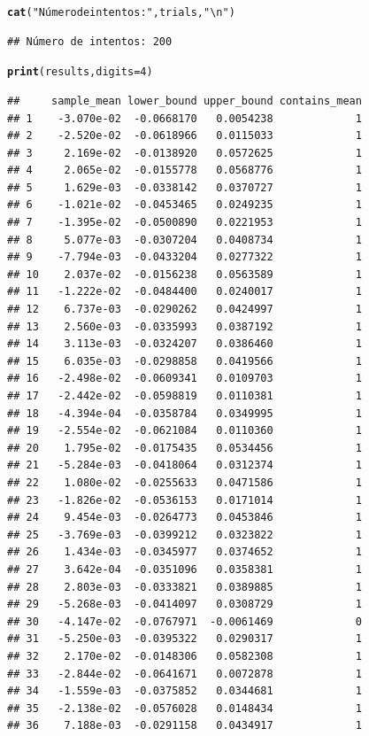 \documentclass[12pt]{article}\usepackage[]{graphicx}\usepackage[]{xcolor}
\makeatletter
\newcommand{\hlnum}[1]{\textcolor[rgb]{0.686,0.059,0.569}{#1}}%
\newcommand{\hlsng}[1]{\textcolor[rgb]{0.192,0.494,0.8}{#1}}%
\newcommand{\hldef}[1]{\textcolor[rgb]{0.345,0.345,0.345}{#1}}%
\newcommand{\hlkwc}[1]{\textcolor[rgb]{0.333,0.667,0.333}{#1}}%
\newcommand{\hlkwd}[1]{\textcolor[rgb]{0.737,0.353,0.396}{\textbf{#1}}}%
\newenvironment{kframe}{%
 \def\at@end@of@kframe{}%
 \ifinner\ifhmode%
  \def\at@end@of@kframe{\end{minipage}}%
  \begin{minipage}{\columnwidth}%
 \fi\fi%
 \def\FrameCommand##1{\hskip\@totalleftmargin \hskip-\fboxsep
 \colorbox{shadecolor}{##1}\hskip-\fboxsep
     \hskip-\linewidth \hskip-\@totalleftmargin \hskip\columnwidth}%
 \MakeFramed {\advance\hsize-\width
   \@totalleftmargin\z@ \linewidth\hsize
   \@setminipage}}%
 {\par\unskip\endMakeFramed%
 \at@end@of@kframe}
\newenvironment{knitrout}{}{} %
\makeatother
\begin{document}
\begin{knitrout}
\begin{kframe}
\begin{alltt}
\hlkwd{cat}\hldef{(}\hlsng{"Número de intentos:"}\hldef{, trials,} \hlsng{"\textbackslash{}n"}\hldef{)}
\end{alltt}
\begin{verbatim}
## Número de intentos: 200
\end{verbatim}
\begin{alltt}
\hlkwd{print}\hldef{(results,} \hlkwc{digits}\hldef{=} \hlnum{4}\hldef{)}
\end{alltt}
\begin{verbatim}
##     sample_mean lower_bound upper_bound contains_mean
## 1    -3.070e-02  -0.0668170   0.0054238             1
## 2    -2.520e-02  -0.0618966   0.0115033             1
## 3     2.169e-02  -0.0138920   0.0572625             1
## 4     2.065e-02  -0.0155778   0.0568776             1
## 5     1.629e-03  -0.0338142   0.0370727             1
## 6    -1.021e-02  -0.0453465   0.0249235             1
## 7    -1.395e-02  -0.0500890   0.0221953             1
## 8     5.077e-03  -0.0307204   0.0408734             1
## 9    -7.794e-03  -0.0433204   0.0277322             1
## 10    2.037e-02  -0.0156238   0.0563589             1
## 11   -1.222e-02  -0.0484400   0.0240017             1
## 12    6.737e-03  -0.0290262   0.0424997             1
## 13    2.560e-03  -0.0335993   0.0387192             1
## 14    3.113e-03  -0.0324207   0.0386460             1
## 15    6.035e-03  -0.0298858   0.0419566             1
## 16   -2.498e-02  -0.0609341   0.0109703             1
## 17   -2.442e-02  -0.0598819   0.0110381             1
## 18   -4.394e-04  -0.0358784   0.0349995             1
## 19   -2.554e-02  -0.0621084   0.0110360             1
## 20    1.795e-02  -0.0175435   0.0534456             1
## 21   -5.284e-03  -0.0418064   0.0312374             1
## 22    1.080e-02  -0.0255633   0.0471586             1
## 23   -1.826e-02  -0.0536153   0.0171014             1
## 24    9.454e-03  -0.0264773   0.0453846             1
## 25   -3.769e-03  -0.0399212   0.0323822             1
## 26    1.434e-03  -0.0345977   0.0374652             1
## 27    3.642e-04  -0.0351096   0.0358381             1
## 28    2.803e-03  -0.0333821   0.0389885             1
## 29   -5.268e-03  -0.0414097   0.0308729             1
## 30   -4.147e-02  -0.0767971  -0.0061469             0
## 31   -5.250e-03  -0.0395322   0.0290317             1
## 32    2.170e-02  -0.0148306   0.0582308             1
## 33   -2.844e-02  -0.0641671   0.0072878             1
## 34   -1.559e-03  -0.0375852   0.0344681             1
## 35   -2.138e-02  -0.0576028   0.0148434             1
## 36    7.188e-03  -0.0291158   0.0434917             1

\end{verbatim}
\end{kframe}
\end{knitrout}
\end{document}
